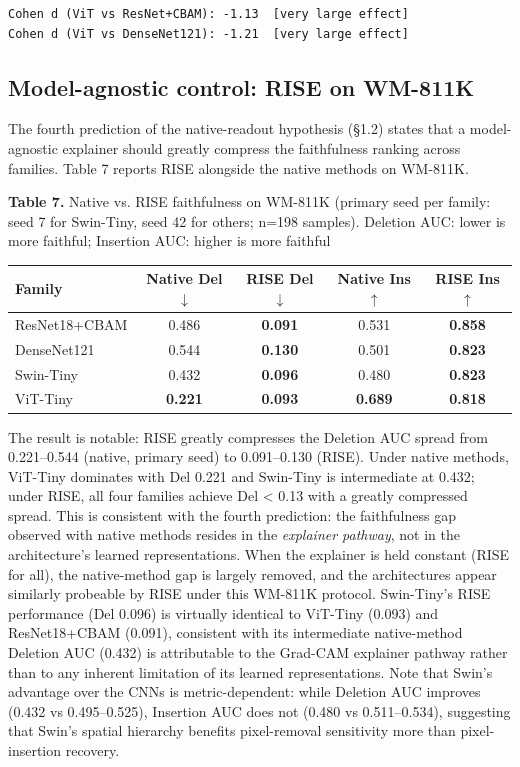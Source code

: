 \documentclass[11pt,a4paper]{article}
\begin{document}
\begin{Verbatim}
Cohen d (ViT vs ResNet+CBAM): -1.13  [very large effect]
Cohen d (ViT vs DenseNet121): -1.21  [very large effect]
\end{Verbatim}



\subsection{Model-agnostic control: RISE on WM-811K}

The fourth prediction of the native-readout hypothesis (\S{}1.2) states that a model-agnostic explainer should greatly compress the faithfulness ranking across families. Table 7 reports RISE alongside the native methods on WM-811K.

\begin{center}
\small \textbf{Table 7.} Native vs. RISE faithfulness on WM-811K (primary seed per family: seed 7 for Swin-Tiny, seed 42 for others; n=198 samples). Deletion AUC: lower is more faithful; Insertion AUC: higher is more faithful
\end{center}

\begin{tabular}{lcccc}
\toprule
Family & Native Del $\downarrow$ & RISE Del $\downarrow$ & Native Ins $\uparrow$ & RISE Ins $\uparrow$ \\
\midrule
ResNet18+CBAM & 0.486 & \textbf{0.091} & 0.531 & \textbf{0.858} \\
DenseNet121 & 0.544 & \textbf{0.130} & 0.501 & \textbf{0.823} \\
Swin-Tiny & 0.432 & \textbf{0.096} & 0.480 & \textbf{0.823} \\
ViT-Tiny & \textbf{0.221} & \textbf{0.093} & \textbf{0.689} & \textbf{0.818} \\
\bottomrule
\end{tabular}


The result is notable: RISE greatly compresses the Deletion AUC spread from 0.221--0.544 (native, primary seed) to 0.091--0.130 (RISE). Under native methods, ViT-Tiny dominates with Del 0.221 and Swin-Tiny is intermediate at 0.432; under RISE, all four families achieve Del < 0.13 with a greatly compressed spread. This is consistent with the fourth prediction: the faithfulness gap observed with native methods resides in the \emph{explainer pathway}, not in the architecture's learned representations. When the explainer is held constant (RISE for all), the native-method gap is largely removed, and the architectures appear similarly probeable by RISE under this WM-811K protocol. Swin-Tiny's RISE performance (Del 0.096) is virtually identical to ViT-Tiny (0.093) and ResNet18+CBAM (0.091), consistent with its intermediate native-method Deletion AUC (0.432) is attributable to the Grad-CAM
explainer pathway rather than to any inherent limitation of its learned representations. Note that Swin's advantage over the CNNs is metric-dependent: while Deletion AUC improves (0.432 vs 0.495--0.525), Insertion AUC does not (0.480 vs 0.511--0.534), suggesting that Swin's spatial hierarchy benefits pixel-removal sensitivity more than pixel-insertion recovery.
\end{document}
